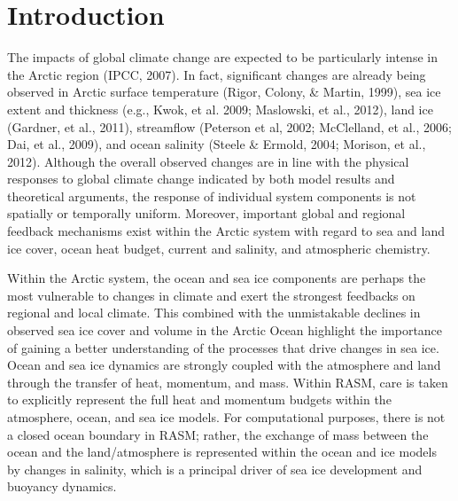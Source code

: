 \section{Introduction}
 
The impacts of global climate change are expected to be particularly intense in the Arctic region (IPCC, 2007).
In fact, significant changes are already being observed in Arctic surface temperature (Rigor, Colony, & Martin, 1999), sea ice extent and thickness (e.g., Kwok, et al. 2009; Maslowski, et al., 2012), land ice (Gardner, et al., 2011), streamflow (Peterson et al, 2002; McClelland, et al., 2006; Dai, et al., 2009), and ocean salinity (Steele & Ermold, 2004; Morison, et al., 2012).
Although the overall observed changes are in line with the physical responses to global climate change indicated by both model results and theoretical arguments, the response of individual system components is not spatially or temporally uniform.
Moreover, important global and regional feedback mechanisms exist within the Arctic system with regard to sea and land ice cover, ocean heat budget, current and salinity, and atmospheric chemistry.

Within the Arctic system, the ocean and sea ice components are perhaps the most vulnerable to changes in climate and exert the strongest feedbacks on regional and local climate.
This combined with the unmistakable declines in observed sea ice cover and volume in the Arctic Ocean highlight the importance of gaining a better understanding of the processes that drive changes in sea ice.
Ocean and sea ice dynamics are strongly coupled with the atmosphere and land through the transfer of heat, momentum, and mass. Within RASM, care is taken to explicitly represent the full heat and momentum budgets within the atmosphere, ocean, and sea ice models.
For computational purposes, there is not a closed ocean boundary in RASM; rather, the exchange of mass between the ocean and the land/atmosphere is represented within the ocean and ice models by changes in salinity, which is a principal driver of sea ice development and buoyancy dynamics. 
  